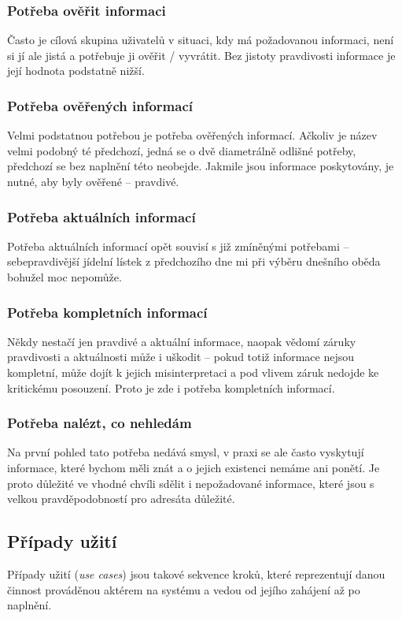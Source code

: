 \subsubsection{Potřeba ověřit informaci}
Často je cílová skupina uživatelů v situaci, kdy má požadovanou informaci, není si jí ale jistá a potřebuje ji ověřit / vyvrátit. Bez jistoty pravdivosti informace je její hodnota podstatně nižší.

\subsubsection{Potřeba ověřených informací}
Velmi podstatnou potřebou je potřeba ověřených informací. Ačkoliv je název velmi podobný té předchozí, jedná se o dvě diametrálně odlišné potřeby, předchozí se bez naplnění této neobejde. Jakmile jsou informace poskytovány, je nutné, aby byly ověřené -- pravdivé.

\subsubsection{Potřeba aktuálních informací}
Potřeba aktuálních informací opět souvisí s již zmíněnými potřebami -- sebepravdivější jídelní lístek z předchozího dne mi při výběru dnešního oběda bohužel moc nepomůže.

\subsubsection{Potřeba kompletních informací}
Někdy nestačí jen pravdivé a aktuální informace, naopak vědomí záruky pravdivosti a aktuálnosti může i uškodit -- pokud totiž informace nejsou kompletní, může dojít k jejich misinterpretaci a pod vlivem záruk nedojde ke kritickému posouzení. Proto je zde i potřeba kompletních informací.

\subsubsection{Potřeba nalézt, co nehledám}
Na první pohled tato potřeba nedává smysl, v praxi se ale často vyskytují informace, které bychom měli znát a o jejich existenci nemáme ani ponětí. Je proto důležité ve vhodné chvíli sdělit i nepožadované informace, které jsou s velkou pravděpodobností pro adresáta důležité.


\subsection{Případy užití}
Případy užití (\textit{use cases}) jsou takové sekvence kroků, které reprezentují danou činnost prováděnou aktérem na systému a vedou od jejího zahájení až po naplnění.

